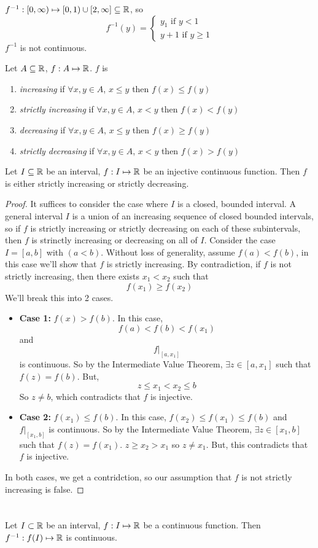 \documentclass[openany]{report}
\begin{document}
    $f^{-1}: [0,\infty) \mapsto [0,1) \cup [2, \infty] \subseteq \mathbb{R}$, so 
    \[f^{-1}(y) = \begin{cases}
        y_1 \text{ if } y < 1 \\
        y + 1 \text{ if } y \geq 1
    \end{cases}\] 
    $f^{-1}$ is not continuous.
    \begin{definition}
        Let $A \subseteq \mathbb{R}$, $f: A \mapsto \mathbb{R}$. $f$ is 
        \begin{enumerate}[label=(\roman*)]
            \item \emph{increasing} if $\forall x,y \in A$, $x \leq y$ then $f(x) \leq f(y)$
            \item \emph{strictly increasing} if $\forall x,y \in A$, $x < y$ then $f(x) < f(y)$
            \item \emph{decreasing} if $\forall x,y \in A$, $x \leq y$ then $f(x) \geq f(y)$
            \item \emph{strictly decreasing} if $\forall x,y \in A$, $x < y$ then $f(x) > f(y)$
        \end{enumerate}
    \end{definition}
    \begin{lemma}
        Let $I \subseteq \mathbb{R}$ be an interval, $f: I \mapsto \mathbb{R}$ be an injective continuous function. Then $f$ is either strictly increasing or strictly decreasing. 
    \end{lemma}
    \begin{proof}
        It suffices to consider the case where $I$ is a closed, bounded interval. A general interval $I$ is a union of an increasing sequence of closed bounded intervals, so if $f$ is strictly increasing or strictly decreasing on each of these subintervals, then $f$ is strinctly increasing or decreasing on all of $I$. Consider the case $I = [a,b]$ with $(a < b)$. Without loss of generality, assume $f(a) < f(b)$, in this case we'll show that $f$ is strictly increasing. By contradiction, if $f$ is not strictly increasing, then there exists $x_1 < x_2$ such that 
        \[f(x_1) \geq f(x_2)\]
        We'll break this into 2 cases. 
        \begin{itemize}
            \item \textbf{Case 1:} $f(x) > f(b)$. In this case,
            \[f(a) < f(b) < f(x_1)\]
            and 
            \[f|_{[a,x_1]}\]
            is continuous. So by the Intermediate Value Theorem, $\exists z \in [a, x_1]$ such that $f(z) = f(b)$. But,
            \[z \leq x_1 < x_2 \leq b\]
            So $z \neq b$, which contradicts that $f$ is injective. 
            \item \textbf{Case 2:} $f(x_1) \leq f(b)$. In this case, $f(x_2) \leq f(x_1) \leq f(b)$ and $f|_{[x_1, b]}$ is continuous. So by the Intermediate Value Theorem, $\exists z \in [x_1, b]$ such that $f(z) = f(x_1)$. $z \geq x_2 > x_1$ so $z \neq x_1$. But, this contradicts that $f$ is injective.
        \end{itemize}
        In both cases, we get a contridction, so our assumption that $f$ is not strictly increasing is false.
    \end{proof}
    \chapter{}
    Let $I \subset \mathbb{R}$ be an interval, $f: I \mapsto \mathbb{R}$ be a continuous function. Then $f^{-1}: f(I) \mapsto \mathbb{R}$ is continuous. 
\end{document}
